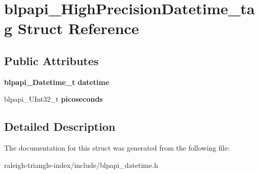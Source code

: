 \section{blpapi\+\_\+\+High\+Precision\+Datetime\+\_\+tag Struct Reference}
\label{structblpapi___high_precision_datetime__tag}
\subsection*{Public Attributes}
\begin{DoxyCompactItemize}
\item 
{\bf blpapi\+\_\+\+Datetime\+\_\+t} {\bfseries datetime}\label{structblpapi___high_precision_datetime__tag_ac8e543f244f5dec0d090d5b7528465d6}

\item 
blpapi\+\_\+\+U\+Int32\+\_\+t {\bfseries picoseconds}\label{structblpapi___high_precision_datetime__tag_a06e6cef288d60fd91fff08f6fadc3c75}

\end{DoxyCompactItemize}


\subsection{Detailed Description}


The documentation for this struct was generated from the following file\+:\begin{DoxyCompactItemize}
\item 
raleigh-\/triangle-\/index/include/blpapi\+\_\+datetime.\+h\end{DoxyCompactItemize}
